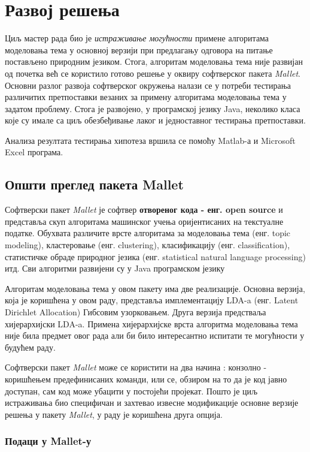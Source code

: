 	
\chapter{Развој решења}

Циљ мастер рада био је \textit{истраживање могућности} примене алгоритама моделовања тема у основној верзији  при предлагању одговора на питање постављено природним језиком. Стога, алгоритам моделовања тема није развијан од почетка већ се користило готово решење у оквиру софтверског пакета \textit{Mallet}.
Основни разлог развоја софтверског окружења налази се у потреби тестирања различитих претпоставки везаних за примену алгоритама моделовања тема у задатом проблему. Стога је развојено, у програмској језику Java, неколико класа које су имале са циљ обезбеђивање лаког и једноставног тестирања претпоставки.

Анализа резултата тестирања хипотеза вршила се помоћу Matlab-а и  Microsoft Excel програма.
 
\section{Општи преглед пакета Mallet}

Софтверски пакет \textit{Mallet} је софтвер \textbf{отвореног кода - енг. open source} и представља скуп алгоритама машинског учења оријентисаних на текстуалне податке. Обухвата различите врсте алгоритама за  моделовања тема (енг. topic modeling), кластеровање (енг. clustering), класификацију (енг. classification), статистичке обраде природног језика (енг. statistical natural language processing) итд. Сви алгоритми развијени су у Java програмском језику

Алгоритам моделовања тема у овом пакету има две реализације. Основна верзија, која је коришћена у овом раду, представља имплементацију LDA-a (енг. Latent Dirichlet Allocation) Гибсовим узорковањем. Друга верзија предстваља хијерархијски LDA-a. Примена хијерархијске врста алгоритма моделовања тема није била предмет овог рада али би било интересантно испитати те могућности у будућем раду.

Софтверски пакет \textit{Mallet} може се користити на два начина : конзолно - коришћењем предефинисаних команди, или се, обзиром на то да је код јавно доступан, сам код може убацити у постојећи пројекат. Пошто је циљ истраживања био специфичан и захтевао извесне модификације основне верзије решења у пакету  \textit{Mallet}, у раду је коришћена друга опција.

 
\subsection{Подаци у Mallet-у}

